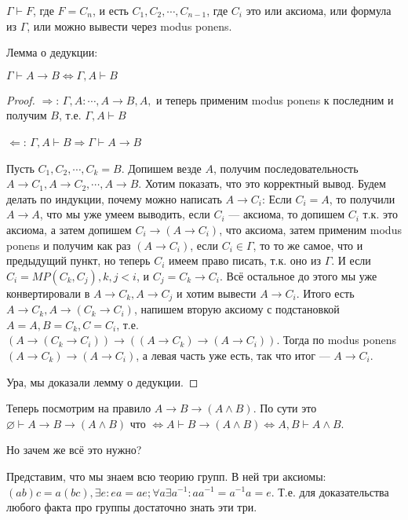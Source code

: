 \begin{definition}
	$\Gamma \vdash F$, где $F = C_n$, и есть $C_1, C_2, \cdots, C_{n-1}$,  где $C_i$ это или аксиома, или формула из $\Gamma$, или можно вывести через modus ponens.  
\end{definition}
\begin{lemma}
	Лемма о дедукции:

	$\Gamma \vdash A \to B \Leftrightarrow \Gamma, A \vdash B$
\end{lemma}
\begin{proof}
	
	$\Rightarrow$: $\Gamma, A : \cdots, A \to B, A, $ и теперь применим modus ponens к последним и получим $B$, т.е. $\Gamma, A \vdash B$

	$\Leftarrow$: $\Gamma, A \vdash B \Rightarrow \Gamma \vdash A \to B$

	Пусть $C_1, C_2, \cdots, C_k = B$. Допишем везде $A$, получим последовательность $A \to C_1, A \to C_2, \cdots, A \to B$. Хотим показать, что это корректный вывод. Будем делать по индукции, почему можно написать $A \to C_i$: Если $C_i = A$, то получили $A \to A$, что мы уже умеем выводить, если $C_i$ --- аксиома, то допишем $C_i$ т.к. это аксиома, а затем допишем $C_i \to (A \to C_i)$, что аксиома, затем применим modus ponens и получим как раз $(A \to C_i)$, если $C_i \in \Gamma$, то то же самое, что и предыдущий пункт, но теперь $C_i$ имеем право писать, т.к. оно из $\Gamma$. И если $C_i = MP(C_k, C_j), k, j < i$, и $C_j = C_k \to C_i$. Всё остальное до этого мы уже конвертировали в $A \to C_k, A \to C_j$ и хотим вывести $A \to C_i$. Итого есть $A \to C_k, A \to (C_k \to C_i)$, напишем вторую аксиому с подстановкой $A = A, B = C_k, C = C_i$, т.е. $(A \to (C_k \to C_i)) \to ((A \to C_k) \to (A \to C_i))$. Тогда по modus ponens $(A \to C_k) \to (A \to C_i)$, а левая часть уже есть, так что итог --- $A \to C_i$.

	Ура, мы доказали лемму о дедукции.
\end{proof}

Теперь посмотрим на правило $A \to B \to (A \land B)$. По сути это $\varnothing \vdash A \to B \to (A \land B)$ что $\Leftrightarrow A \vdash B \to (A \land B) \Leftrightarrow A, B \vdash A \land B$.

Но зачем же всё это нужно?

Представим, что мы знаем всю теорию групп. В ней три аксиомы: $(ab)c = a(bc), \exists e : ea = ae; \forall a \exists a^{-1}: a a^{-1} = a^{-1} a = e$. Т.е. для доказательства любого факта про группы достаточно знать эти три. 


